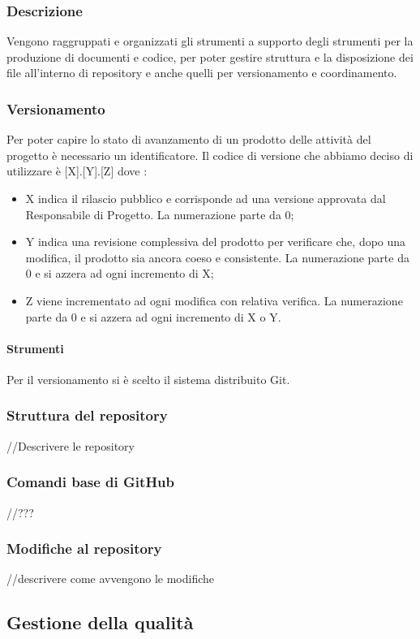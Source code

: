 \subsubsection{Descrizione}
Vengono raggruppati e organizzati gli strumenti a supporto degli strumenti per la produzione di documenti e codice, per poter gestire struttura e la disposizione dei file all’interno di repository e anche  quelli per versionamento e coordinamento.

\subsubsection{Versionamento}
Per poter capire lo stato di avanzamento di un prodotto delle attività del progetto è necessario un identificatore. Il codice di versione che abbiamo deciso di utilizzare è [X].[Y].[Z] dove :
\begin{itemize}
\item X indica il rilascio pubblico e corrisponde ad una versione approvata dal Responsabile di Progetto. La numerazione parte da 0;
\item Y indica una revisione complessiva del prodotto per verificare che, dopo una modifica, il prodotto sia ancora coeso e consistente. La numerazione parte da 0 e si azzera ad ogni incremento di X;
\item Z viene incrementato ad ogni modifica con relativa verifica. La numerazione parte da 0 e si azzera ad ogni incremento di X o Y.
\end{itemize}

\paragraph{Strumenti}
Per il versionamento si è scelto il sistema distribuito Git.

\subsubsection{Struttura del repository}
//Descrivere le repository
\subsubsection{Comandi base di GitHub}
//???
\subsubsection{Modifiche al repository}
//descrivere come avvengono le modifiche

\subsection{Gestione della qualità}
